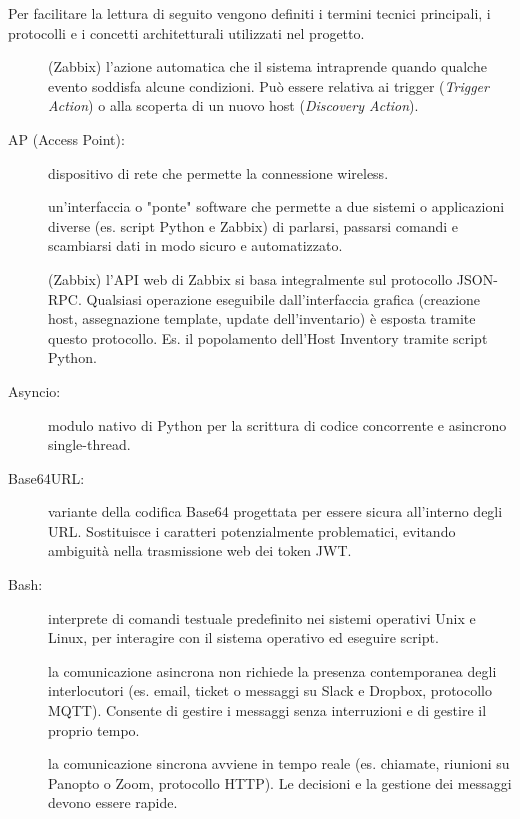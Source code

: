 \documentclass[12pt, a4paper, oneside]{report}
\begin{document}
Per facilitare la lettura di seguito vengono definiti i termini tecnici principali,
i protocolli e i concetti architetturali utilizzati nel progetto.
\begin{description}
    \item[\hypertarget{glo:action}Action:] (Zabbix) l'azione automatica che il sistema intraprende quando qualche evento soddisfa alcune condizioni. Può essere relativa ai trigger (\textit{Trigger Action}) o alla scoperta di un nuovo host (\textit{Discovery Action}).
    \item[AP (Access Point):] dispositivo di rete che permette la connessione wireless.
    \item[\hypertarget{glo:api}API (Application Programming Interface):] un'interfaccia o "ponte" software che permette a due sistemi o applicazioni diverse (es. script Python e Zabbix) di parlarsi, passarsi comandi e scambiarsi dati in modo sicuro e automatizzato.
    \item[\hypertarget{glo:apijsonrpc}API JSON-RPC :] (Zabbix) l'API web di Zabbix si basa integralmente sul protocollo JSON-RPC. Qualsiasi operazione eseguibile dall'interfaccia grafica (creazione host, assegnazione template, update dell'inventario) è esposta tramite questo protocollo. Es. il popolamento dell'Host Inventory tramite script Python.
    \item[Asyncio:] modulo nativo di Python per la scrittura di codice concorrente e asincrono single-thread.
    \item[Base64URL:] variante della codifica Base64 progettata per essere sicura all'interno degli URL. Sostituisce i caratteri potenzialmente problematici, evitando ambiguità nella trasmissione web dei token JWT.
    \item[Bash:] interprete di comandi testuale predefinito nei sistemi operativi Unix e Linux, per interagire con il sistema operativo ed eseguire script.
    \item[\hypertarget{glo:comunicazioneasincrona}Comunicazione asincrona:] la comunicazione asincrona non richiede la presenza contemporanea degli interlocutori (es. email, ticket o messaggi su Slack e Dropbox, protocollo MQTT). Consente di gestire i messaggi senza interruzioni e di gestire il proprio tempo.
    \item[\hypertarget{glo:comunicazionesincrona}Comunicazione sincrona:] la comunicazione sincrona avviene in tempo reale (es. chiamate, riunioni su Panopto o Zoom, protocollo HTTP). Le decisioni e la gestione dei messaggi devono essere rapide.

\end{description}
\end{document}
